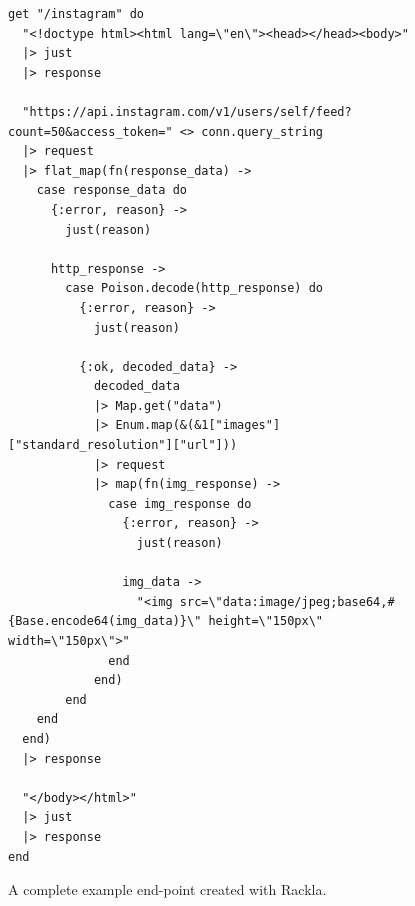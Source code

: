 \documentclass{cslthse-msc}
\begin{document}
\begin{figure}[H]
  \centering
\begin{lstlisting}[breaklines=true,frame=single]
get "/instagram" do
  "<!doctype html><html lang=\"en\"><head></head><body>"
  |> just
  |> response

  "https://api.instagram.com/v1/users/self/feed?count=50&access_token=" <> conn.query_string
  |> request
  |> flat_map(fn(response_data) ->
    case response_data do
      {:error, reason} ->
        just(reason)
        
      http_response ->
        case Poison.decode(http_response) do
          {:error, reason} ->
            just(reason)
            
          {:ok, decoded_data} ->
            decoded_data
            |> Map.get("data")
            |> Enum.map(&(&1["images"]["standard_resolution"]["url"]))
            |> request
            |> map(fn(img_response) ->
              case img_response do
                {:error, reason} ->
                  just(reason)
                  
                img_data ->
                  "<img src=\"data:image/jpeg;base64,#{Base.encode64(img_data)}\" height=\"150px\" width=\"150px\">"
              end
            end)
        end
    end
  end)
  |> response
  
  "</body></html>"
  |> just
  |> response
end
\end{lstlisting}
  \caption{A complete example end-point created with Rackla.}
\end{figure}
\end{document}
